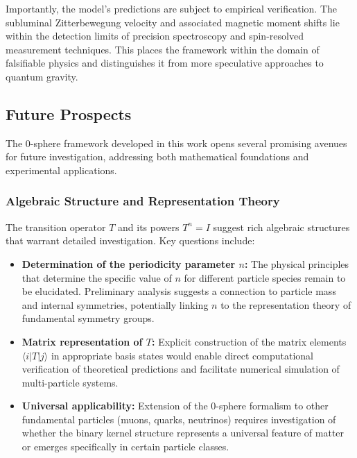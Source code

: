 \documentclass[%
 reprint,
 amsmath,amssymb,
 aps,
]{revtex4-1}
\numberwithin{equation}{section}%
\begin{document}
Importantly, the model's predictions are subject to empirical verification. The subluminal Zitterbewegung velocity and associated magnetic moment shifts lie within the detection limits of precision spectroscopy and spin-resolved measurement techniques. This places the framework within the domain of falsifiable physics and distinguishes it from more speculative approaches to quantum gravity.


\subsection{Future Prospects}
\label{subsec:future_prospects}

The 0-sphere framework developed in this work opens several promising avenues 
for future investigation, addressing both mathematical foundations and 
experimental applications.

\subsubsection{Algebraic Structure and Representation Theory}
\label{subsubsec:algebraic_structure}

The transition operator $T$ and its powers $T^n = I$ suggest rich algebraic 
structures that warrant detailed investigation. Key questions include:

\begin{itemize}
\item \textbf{Determination of the periodicity parameter $n$:} The physical principles that determine the specific value of $n$ for different particle species remain to be elucidated. Preliminary analysis suggests a connection to particle mass and internal symmetries, potentially linking $n$ to the representation theory of fundamental 
symmetry groups.

\item \textbf{Matrix representation of $T$:} Explicit construction of the matrix elements $\langle i|T|j \rangle$ in appropriate basis states would enable direct computational verification of theoretical predictions and 
facilitate numerical simulation of multi-particle systems.

\item \textbf{Universal applicability:} Extension of the 0-sphere formalism 
to other fundamental particles (muons, quarks, neutrinos) requires investigation of whether the binary kernel structure represents a universal feature of matter or emerges specifically in certain particle classes.
\end{itemize}
\end{document}
